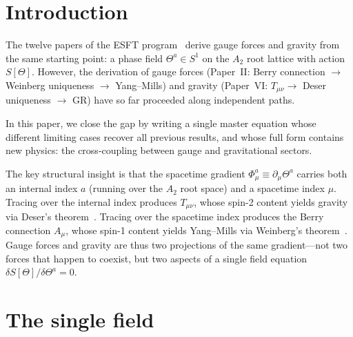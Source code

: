 \documentclass[twocolumn,preprintnumbers,amsmath,amssymb,prd]{revtex4-2}
\begin{document}
\maketitle

\section{Introduction}
\label{sec:intro}

The twelve papers of the ESFT program~\cite{Paper1,Paper2,Paper3,Paper4,Paper5,Paper6,Paper7,Paper8,Paper9,Paper10,Paper11,Paper12} derive gauge forces and gravity from the same starting point: a phase field $\Theta^a \in S^1$ on the $A_2$ root lattice with action $S[\Theta]$.
However, the derivation of gauge forces (Paper~II: Berry connection $\to$ Weinberg uniqueness $\to$ Yang--Mills) and gravity (Paper~VI: $T_{\mu\nu} \to$ Deser uniqueness $\to$ GR) have so far proceeded along independent paths.

In this paper, we close the gap by writing a single master equation whose different limiting cases recover all previous results, and whose full form contains new physics: the cross-coupling between gauge and gravitational sectors.

The key structural insight is that the spacetime gradient $\Phi_\mu^a \equiv \partial_\mu\Theta^a$ carries both an internal index $a$ (running over the $A_2$ root space) and a spacetime index $\mu$.
Tracing over the internal index produces $T_{\mu\nu}$, whose spin-2 content yields gravity via Deser's theorem~\cite{Deser1970}.
Tracing over the spacetime index produces the Berry connection $A_\mu$, whose spin-1 content yields Yang--Mills via Weinberg's theorem~\cite{Weinberg1979}.
Gauge forces and gravity are thus two projections of the same gradient---not two forces that happen to coexist, but two aspects of a single field equation $\delta S[\Theta]/\delta\Theta^a = 0$.

\section{The single field}
\label{sec:field}
\end{document}
